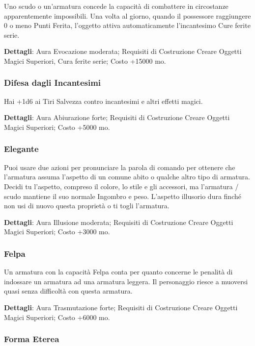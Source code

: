 \begin{multicols}{2}
Uno scudo o un'armatura concede la capacità di combattere in circostanze apparentemente impossibili. Una volta al giorno, quando il possessore raggiungere 0 o meno Punti Ferita, l'oggetto attiva automaticamente l'incantesimo Cure ferite serie.

\textbf{Dettagli}: Aura Evocazione moderata; Requisiti di Costruzione Creare Oggetti Magici Superiori, Cura ferite serie; Costo +15000 mo.

\subsubsection*{Difesa dagli Incantesimi}

Hai +1d6 ai Tiri Salvezza contro incantesimi e altri effetti magici.

\textbf{Dettagli}: Aura Abiurazione forte; Requisiti di Costruzione Creare Oggetti Magici Superiori; Costo +5000 mo.

\subsubsection*{Elegante}

Puoi usare due azioni per pronunciare la parola di comando per ottenere che l'armatura assuma l'aspetto di un comune abito o qualche altro tipo di armatura. Decidi tu l'aspetto, compreso il colore, lo stile e gli accessori, ma l'armatura / scudo mantiene il suo normale Ingombro e peso. L'aspetto illusorio dura finché non usi di nuovo questa proprietà o ti togli l'armatura.

\textbf{Dettagli}: Aura Illusione moderata; Requisiti di Costruzione Creare Oggetti Magici Superiori; Costo +3000 mo.


\subsubsection*{Felpa}

Un armatura con la capacità Felpa conta per quanto concerne le penalità di indossare un armatura ad una armatura leggera. Il personaggio riesce a muoversi quasi senza difficoltà con questa armatura.

\textbf{Dettagli}: Aura Trasmutazione forte; Requisiti di Costruzione Creare Oggetti Magici Superiori; Costo +6000 mo.

\subsubsection*{Forma Eterea}


\end{multicols}
